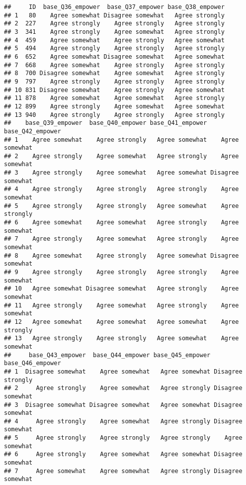 \documentclass[]{article}
\begin{document}
\begin{verbatim}
##     ID  base_Q36_empower  base_Q37_empower base_Q38_empower
## 1   80    Agree somewhat Disagree somewhat   Agree strongly
## 2  227    Agree strongly    Agree strongly   Agree strongly
## 3  341    Agree strongly    Agree somewhat   Agree strongly
## 4  459    Agree somewhat    Agree strongly   Agree somewhat
## 5  494    Agree strongly    Agree strongly   Agree strongly
## 6  652    Agree somewhat Disagree somewhat   Agree somewhat
## 7  668    Agree somewhat    Agree strongly   Agree strongly
## 8  700 Disagree somewhat    Agree somewhat   Agree strongly
## 9  797    Agree strongly    Agree strongly   Agree strongly
## 10 831 Disagree somewhat    Agree strongly   Agree somewhat
## 11 878    Agree somewhat    Agree somewhat   Agree strongly
## 12 899    Agree strongly    Agree somewhat   Agree somewhat
## 13 940    Agree strongly    Agree strongly   Agree strongly
##    base_Q39_empower  base_Q40_empower base_Q41_empower  base_Q42_empower
## 1    Agree somewhat    Agree strongly   Agree somewhat    Agree somewhat
## 2    Agree strongly    Agree somewhat   Agree strongly    Agree somewhat
## 3    Agree strongly    Agree somewhat   Agree somewhat Disagree somewhat
## 4    Agree strongly    Agree strongly   Agree strongly    Agree somewhat
## 5    Agree strongly    Agree strongly   Agree somewhat    Agree strongly
## 6    Agree somewhat    Agree somewhat   Agree strongly    Agree somewhat
## 7    Agree strongly    Agree somewhat   Agree strongly    Agree somewhat
## 8    Agree somewhat    Agree strongly   Agree somewhat Disagree somewhat
## 9    Agree strongly    Agree strongly   Agree strongly    Agree somewhat
## 10   Agree somewhat Disagree somewhat   Agree strongly    Agree somewhat
## 11   Agree strongly    Agree somewhat   Agree strongly    Agree somewhat
## 12   Agree somewhat    Agree somewhat   Agree somewhat    Agree strongly
## 13   Agree strongly    Agree strongly   Agree somewhat    Agree somewhat
##     base_Q43_empower  base_Q44_empower base_Q45_empower  base_Q46_empower
## 1  Disagree somewhat    Agree somewhat   Agree somewhat Disagree strongly
## 2     Agree strongly    Agree somewhat   Agree strongly Disagree somewhat
## 3  Disagree somewhat Disagree somewhat   Agree somewhat Disagree somewhat
## 4     Agree strongly    Agree somewhat   Agree strongly Disagree somewhat
## 5     Agree strongly    Agree strongly   Agree strongly    Agree somewhat
## 6     Agree strongly    Agree somewhat   Agree somewhat Disagree somewhat
## 7     Agree somewhat    Agree somewhat   Agree strongly Disagree somewhat

\end{verbatim}
\end{document}
